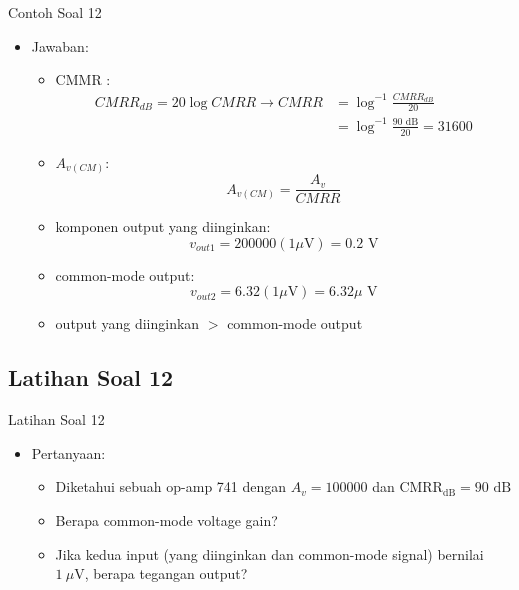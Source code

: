\documentclass[aspectratio=169]{beamer}
\begin{document}
\begin{frame}{Contoh Soal 12}
	\begin{itemize}
		\item Jawaban:
		\begin{itemize}
			\item CMMR :
			\begin{align*}
				CMRR_{dB} = 20 \log CMRR \rightarrow CMRR &= \log^{-1}\frac{ CMRR_{dB} }{20} \\
				&= \log^{-1} \frac{ 90 \text{ dB} }{20} = 31600
			\end{align*}
			\item $ A_{v(CM)} $:
			\[ A_{v(CM)} =  \frac{A_v}{CMRR} \]
			\item komponen output yang diinginkan:
			\[ v_{out1} = 200000(1 \mu\text{V}) = 0.2 \text{ V} \]
			\item common-mode output:
			\[ v_{out2} = 6.32(1 \mu\text{V}) = 6.32 \mu\text{ V} \]
			\item output yang diinginkan $ > $ common-mode output
		\end{itemize}
	\end{itemize}
\end{frame}

\subsection{Latihan Soal 12}
\begin{frame}{Latihan Soal 12}
	\begin{itemize}
		\item Pertanyaan:
		\begin{itemize}
			\item Diketahui sebuah op-amp 741 dengan $ A_v = 100000 $ dan $ \text{CMRR}_\text{dB} = 90 \text{ dB}$
			\item Berapa common-mode voltage gain?
			\item Jika kedua input (yang diinginkan dan common-mode signal) bernilai $ 1~\mu\text{V} $, berapa tegangan output?
		\end{itemize}
	\end{itemize}
\end{frame}
\end{document}

